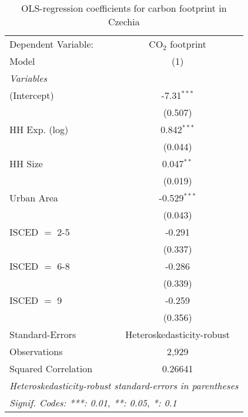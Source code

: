 
\begin{table}[htbp!]
   \centering
   \small
   \begin{adjustbox}{width = 1\textwidth, max height = 0.95\textheight, center}
      \begin{threeparttable}[b]
         \caption{\label{tab:OLS_2_CZE} OLS-regression coefficients for carbon footprint in Czechia}
         \begin{tabular}{lc}
            \tabularnewline \midrule \midrule
            Dependent Variable: & CO$_{2}$ footprint\\  
            Model               & (1)\\  
            \midrule
            \emph{Variables}\\
            (Intercept)         & -7.31$^{***}$\\   
                                & (0.507)\\   
            HH Exp. (log)       & 0.842$^{***}$\\   
                                & (0.044)\\   
            HH Size             & 0.047$^{**}$\\   
                                & (0.019)\\   
            Urban Area          & -0.529$^{***}$\\   
                                & (0.043)\\   
            ISCED $=$ 2-5       & -0.291\\   
                                & (0.337)\\   
            ISCED $=$ 6-8       & -0.286\\   
                                & (0.339)\\   
            ISCED $=$ 9         & -0.259\\   
                                & (0.356)\\   
            \midrule 
            Standard-Errors     & Heteroskedasticity-robust \\   
            Observations        & 2,929\\  
            Squared Correlation & 0.26641\\  
            \midrule \midrule
            \multicolumn{2}{l}{\emph{Heteroskedasticity-robust standard-errors in parentheses}}\\
            \multicolumn{2}{l}{\emph{Signif. Codes: ***: 0.01, **: 0.05, *: 0.1}}\\
         \end{tabular}
         

\end{threeparttable}
\end{adjustbox}
\end{table}
